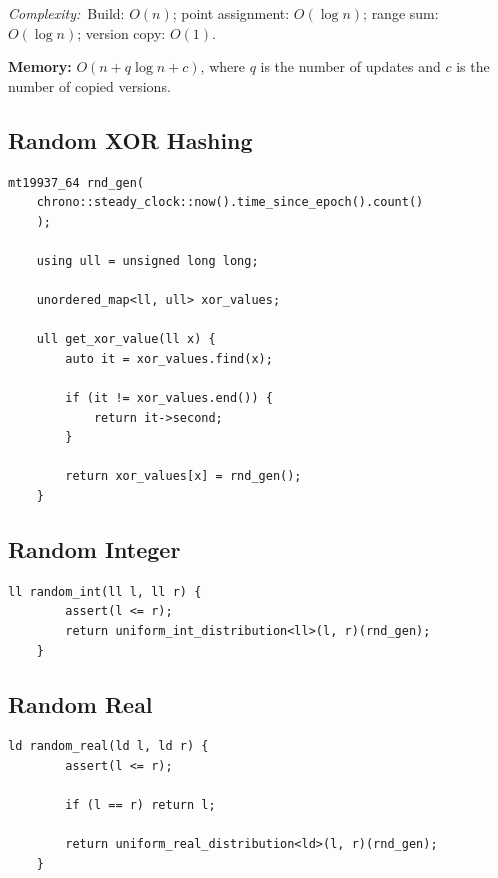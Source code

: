 \documentclass[10pt,a4paper]{article}
\newcommand{\complexity}[1]{\textit{Complexity:}~#1}
\begin{document}
\complexity{Build: $O(n)$; point assignment: $O(\log n)$;
	range sum: $O(\log n)$; version copy: $O(1)$.}

\textbf{Memory:} $O(n+q\log n+c)$, where $q$ is the
number of updates and $c$ is the number of copied versions.

\subsection*{Random XOR Hashing}

\begin{lstlisting}[style=cpp]
	mt19937_64 rnd_gen(
	chrono::steady_clock::now().time_since_epoch().count()
	);
	
	using ull = unsigned long long;
	
	unordered_map<ll, ull> xor_values;
	
	ull get_xor_value(ll x) {
		auto it = xor_values.find(x);
		
		if (it != xor_values.end()) {
			return it->second;
		}
		
		return xor_values[x] = rnd_gen();
	}
\end{lstlisting}

\subsection*{Random Integer}

\begin{lstlisting}[style=cpp]
	ll random_int(ll l, ll r) {
		assert(l <= r);
		return uniform_int_distribution<ll>(l, r)(rnd_gen);
	}
\end{lstlisting}

\subsection*{Random Real}

\begin{lstlisting}[style=cpp]
	ld random_real(ld l, ld r) {
		assert(l <= r);
		
		if (l == r) return l;
		
		return uniform_real_distribution<ld>(l, r)(rnd_gen);
	}
\end{lstlisting}
\end{document}
